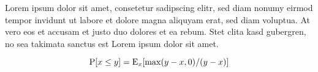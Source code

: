 \documentclass[14pt]{article}
\def\E{}
\renewcommand{\E}[2][]{\ensuremath\mathrm{E}_{#1}\!\left[#2\right]}
\def\PP{\ensuremath\mathrm{P}}
\begin{document}
Lorem ipsum dolor sit amet, consetetur sadipscing elitr, sed diam nonumy eirmod
tempor invidunt ut labore et dolore magna aliquyam erat, sed diam voluptua. At
vero eos et accusam et justo duo dolores et ea rebum. Stet clita kasd
gubergren, no sea takimata sanctus est Lorem ipsum dolor sit amet.

\begin{equation}
    \PP[x\le y] = \E[x]{\max(y-x,0)/(y-x)}
\end{equation}
\end{document}
